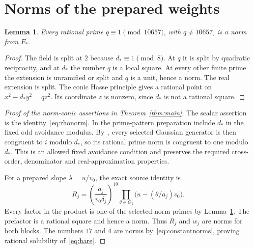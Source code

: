 \documentclass[11pt,a4paper]{article}
\newtheorem{lemma}[theorem]{Lemma}
\begin{document}
\section{Norms of the prepared weights}
\begin{lemma}\label{lem:prime}
Every rational prime $q\equiv1\pmod{10657}$, with $q\ne10657$,
is a norm from $F_*$.
\end{lemma}
\begin{proof}
The field is split at $2$ because $d_*\equiv1\pmod8$.
At $q$ it is split by quadratic reciprocity, and at $d_*$ the
number $q$ is a local square. At every other finite prime the
extension is unramified or split and $q$ is a unit, hence a norm.
The real extension is split. The conic Hasse principle
\cite[Theorem~26.1 and Corollary~26.5]{Poonen} gives a rational
point on $x^2-d_*y^2=qz^2$. Its coordinate $z$ is nonzero,
since $d_*$ is not a rational square.
\end{proof}

\begin{proof}[Proof of the norm-conic assertions in Theorem~\ref{thm:main}]
The scalar assertion is the identity~\eqref{eq:rhonorm}.
In the prime-pattern preparation include $d_*$ in the fixed odd
avoidance modulus. By~\cite[Section~3]{Dependencies}, every selected
Gaussian generator is then congruent to $i$ modulo $d_*$, so its
rational prime norm is congruent to one modulo $d_*$.
This is an allowed fixed avoidance condition and preserves the
required cross-order, denominator and real-approximation properties.

For a prepared slope $\lambda=u/v_0$, the exact source identity is
\[
 R_j=\left(\frac{a_j}{v_0\delta_j}\right)^{10}
       \prod_{\theta\in\Theta_j}
                     \bigl(u-(\theta/a_j)v_0\bigr).
\]
Every factor in the product is one of the selected norm primes by
Lemma~\ref{lem:prime}. The prefactor is a rational square and hence
a norm. Thus $R_j$ and $w_j$ are norms for both blocks. The numbers
$17$ and $4$ are norms by~\eqref{eq:constantnorms}, proving rational
solubility of~\eqref{eq:bare}.
\end{proof}
\end{document}
